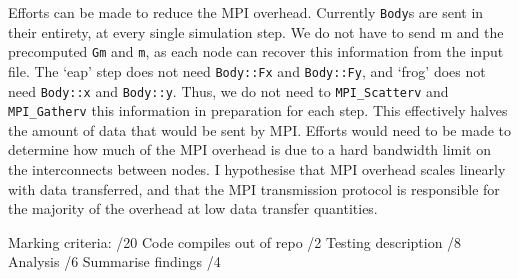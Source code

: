 \documentclass[11pt,a4paper]{article}
\begin{document}
Efforts can be made to reduce the MPI overhead. Currently \texttt{Body}s are sent in their entirety, at every single simulation step. We do not have to send m and the precomputed \texttt{Gm} and \texttt{m}, as each node can recover this information from the input file. The `eap' step does not need \texttt{Body::Fx} and \texttt{Body::Fy}, and `frog' does not need \texttt{Body::x} and \texttt{Body::y}. Thus, we do not need to \texttt{MPI\_Scatterv} and \texttt{MPI\_Gatherv} this information in preparation for each step. This effectively halves the amount of data that would be sent by MPI. Efforts would need to be made to determine how much of the MPI overhead is due to a hard bandwidth limit on the interconnects between nodes. I hypothesise that MPI overhead scales linearly with data transferred, and that the MPI transmission protocol is responsible for the majority of the overhead at low data transfer quantities. 

Marking criteria: /20
  Code compiles out of repo /2
  Testing description       /8
  Analysis                  /6
  Summarise findings        /4



\end{document}
